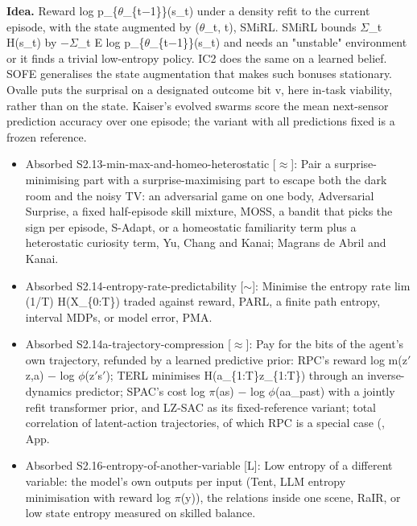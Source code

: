 \documentclass[10pt]{article}
\begin{document}
\textbf{Idea.} Reward log p\_\{\ensuremath{\theta}\_\{t\ensuremath{-}1\}\}(s\_t) under a density refit to the current episode, with the state augmented by (\ensuremath{\theta}\_t, t), SMiRL. SMiRL bounds \ensuremath{\Sigma}\_t H(s\_t) by \ensuremath{-}\ensuremath{\Sigma}\_t E log p\_\{\ensuremath{\theta}\_\{t\ensuremath{-}1\}\}(s\_t) and needs an "unstable" environment or it finds a trivial low-entropy policy. IC2 does the same on a learned belief. SOFE generalises the state augmentation that makes such bonuses stationary. Ovalle puts the surprisal on a designated outcome bit v, here in-task viability, rather than on the state. Kaiser's evolved swarms score the mean next-sensor prediction accuracy over one episode; the variant with all predictions fixed is a frozen reference.
\begin{itemize}[nosep,leftmargin=1.2em]
\item Absorbed S2.13-min-max-and-homeo-heterostatic [\ensuremath{\approx}]: Pair a surprise-minimising part with a surprise-maximising part to escape both the dark room and the noisy TV: an adversarial game on one body, Adversarial Surprise, a fixed half-episode skill mixture, MOSS, a bandit that picks the sign per episode, S-Adapt, or a homeostatic familiarity term plus a heterostatic curiosity term, Yu, Chang and Kanai; Magrans de Abril and Kanai.
\item Absorbed S2.14-entropy-rate-predictability [\ensuremath{\sim}]: Minimise the entropy rate lim (1/T) H(X\_\{0:T\}) traded against reward, PARL, a finite path entropy, interval MDPs, or model error, PMA.
\item Absorbed S2.14a-trajectory-compression [\ensuremath{\approx}]: Pay for the bits of the agent's own trajectory, refunded by a learned predictive prior: RPC's reward log m(z\ensuremath{'}\textbar{}z,a) \ensuremath{-} log \ensuremath{\phi}(z\ensuremath{'}\textbar{}s\ensuremath{'}); TERL minimises H(a\_\{1:T\}\textbar{}z\_\{1:T\}) through an inverse-dynamics predictor; SPAC's cost log \ensuremath{\pi}(a\textbar{}s) \ensuremath{-} log \ensuremath{\phi}(a\textbar{}a\_past) with a jointly refit transformer prior, and LZ-SAC as its fixed-reference variant; total correlation of latent-action trajectories, of which RPC is a special case (\citet{You-maximum25}, App.
\item Absorbed S2.16-entropy-of-another-variable [L]: Low entropy of a different variable: the model's own outputs per input (Tent, LLM entropy minimisation with reward log \ensuremath{\pi}(y)), the relations inside one scene, RaIR, or low state entropy measured on skilled balance.
\end{itemize}
\end{document}
